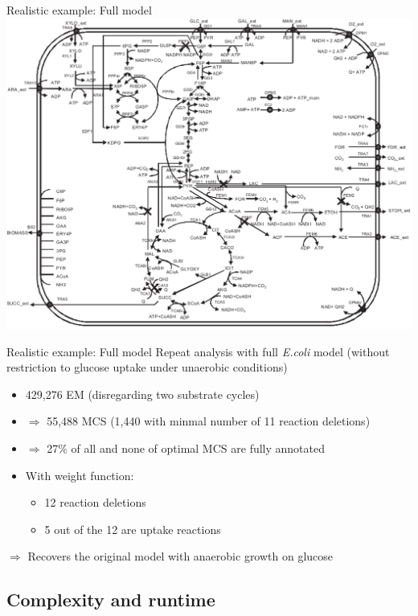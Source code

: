 \documentclass{beamer}
\begin{document}
\begin{frame}{Realistic example: Full model}
    \includegraphics[height=.93\textheight]{grafik/fullmodel}
\end{frame}

\begin{frame}{Realistic example: Full model}
Repeat analysis with full \emph{E.coli} model 
(without restriction to glucose uptake under unaerobic conditions)
\pause
\begin{itemize}
	\item 429,276 EM (disregarding two substrate cycles) %
	\item $\Rightarrow$ 55,488 MCS (1,440 with minmal number of 11 reaction deletions)
	\item $\Rightarrow$ 27\% of all and none of optimal MCS are fully annotated
\pause
	\item With weight function:
	\begin{itemize}
		\item 12 reaction deletions
		\item 5 out of the 12 are uptake reactions
	\end{itemize}
\end{itemize}
$\Rightarrow$ Recovers the original model with anaerobic growth on glucose

\end{frame}

\subsection{Complexity and runtime}
\end{document}
